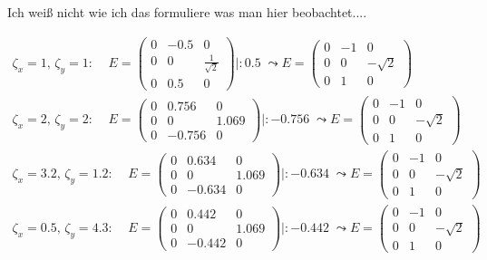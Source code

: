 
Ich weiß nicht wie ich das formuliere was man hier beobachtet.... 

\begin{gather*}
		\zeta_x = 1, \, \zeta_y = 1: \; \; \;\;
	E = \begin{pmatrix}
		0&-0.5&0\\
		0&0&\frac{1}{\sqrt{2}}\\
		0&0.5&0
	\end{pmatrix} |: 0.5 \; \leadsto
E = \begin{pmatrix}
	0&-1&0\\
	0&0&-\sqrt{2}\\
	0&1&0
\end{pmatrix}\\
		\zeta_x = 2, \, \zeta_y = 2: \; \; \;\;
E = \begin{pmatrix}
	0&0.756&0\\
	0&0&1.069\\
	0&-0.756&0
\end{pmatrix} |: -0.756 \; \leadsto
E = \begin{pmatrix}
	0&-1&0\\
	0&0&-\sqrt{2}\\
	0&1&0
\end{pmatrix}\\
		\zeta_x = 3.2, \, \zeta_y = 1.2: \; \; \;\;
E = \begin{pmatrix}
	0&0.634&0\\
	0&0&1.069\\
	0&-0.634&0
\end{pmatrix} |: -0.634 \; \leadsto
E = \begin{pmatrix}
	0&-1&0\\
	0&0&-\sqrt{2}\\
	0&1&0
\end{pmatrix}\\
		\zeta_x = 0.5, \, \zeta_y = 4.3: \; \; \;\;
E = \begin{pmatrix}
	0&0.442&0\\
	0&0&1.069\\
	0&-0.442&0
\end{pmatrix} |: -0.442 \; \leadsto
E = \begin{pmatrix}
	0&-1&0\\
	0&0&-\sqrt{2}\\
	0&1&0
\end{pmatrix}\\
\end{gather*}

